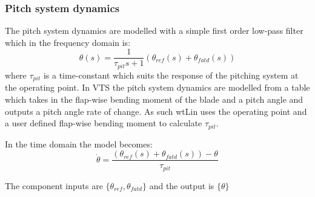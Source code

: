 \subsubsection{Pitch system dynamics} \label{sec:mod_wtLin_pitch}
The pitch system dynamics are modelled with a simple first order low-pass filter which in the frequency domain is:
\begin{equation}\label{eq:wtLin_pitch_freq}
	\theta(s) = \dfrac{1}{\tau_{pit} s + 1} (\theta_{ref}(s) + \theta_{fatd}(s))
\end{equation}
where $ \tau_{pit} $ is a time-constant which suits the response of the pitching system at the operating point. In VTS the pitch system dynamics are modelled from a table which takes in the flap-wise bending moment of the blade and a pitch angle and outputs a pitch angle rate of change. As such wtLin uses the operating point and a user defined flap-wise bending moment to calculate $ \tau_{pit} $.

In the time domain the model becomes:
\begin{equation}\label{eq:wtLin_pitch_time}
	\dot{\theta} =\dfrac{(\theta_{ref}(s) + \theta_{fatd}(s)) - \theta}{\tau_{pit}}
\end{equation}


The component inputs are $ \{\theta_{ref}, \theta_{fatd}  \} $ and the output is $ \{\theta \} $


